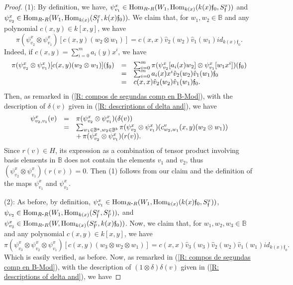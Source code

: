\documentclass{article}
\theoremstyle{definition}
\newcommand{\Hom}{{ \rm Hom }}
\renewcommand{\frak}{\mathfrak}
\newcommand{\g}{\hbox{-}}
\newcommand{\hueca}[1]{\mathbb{#1}}
\begin{document}
\begin{proof} (1): By definition, we have,
$\psi^x_{v_1}\in \Hom_{R\g R}(W_1,\Hom_{k(x)}(k(x)\frak{f}_0,S^x_\frak{f}))$  and  $\psi^x_{v_2}\in \Hom_{R\g R}(W_1,\Hom_{k(x)}(S^x_\frak{f},k(x)\frak{f}_0)).$
We claim that, for $w_1,w_2\in \hueca{B}$ and  any polynomial $c(x,y)\in k[x,y]$, we have 
$$\pi (\psi^x_{v_2}\otimes\psi^x_{v_1})[c(x,y)(w_2\otimes w_1)]=c(x,x)\hat{v}_2(w_2)\hat{v}_1(w_1)id_{k(x)\frak{f}_0}.$$  
Indeed, if $c(x,y)=\sum_{i=0}^ma_i(y)x^i$, we have
$$\begin{matrix}
\pi (\psi^x_{v_2}\otimes\psi^x_{v_1})[c(x,y)(w_2\otimes w_1)](\frak{f}_0)
&=&
\sum_{i=0}^m\pi(\psi^x_{v_2}[a_i(x)w_2]\otimes \psi^x_{v_1}[w_1x^i])(\frak{f}_0)\hfill\\
&=&
\sum_{i=0}^ma_i(x)x^i\hat{v}_2(w_2)\hat{v}_1(w_1)\frak{f}_0\hfill\\
&=&
c(x,x)\hat{v}_2(w_2)\hat{v}_1(w_1)\frak{f}_0.\hfill\\
\end{matrix}$$
Then, as remarked in (\ref{R: compos de segundas comp en B-Mod}), with the description of $\delta(v)$ given  in (\ref{R: descriptions of delta and}), we have 
$$\begin{matrix} 
\psi^x_{v_2,v_1}(v)&=&\pi (\psi^x_{v_2}\otimes\psi^x_{v_1})(\delta(v))\hfill\\
&=&
\sum_{w_1\in \hueca{B}^a,w_2\in \hueca{B}^b}\pi (\psi^x_{v_2}\otimes\psi^x_{v_1})(c^v_{w_2,w_1}(x,y)(w_2\otimes w_1))\hfill\\
&&+\,\pi (\psi^x_{v_2}\otimes\psi^x_{v_1})(r(v)).\hfill\\
\end{matrix}$$
Since $r(v)\in H$, its expression as a combination of tensor product involving  basis  elements in $\hueca{B}$ does not contain the elements $v_1$ and $v_2$, thus  $(\psi^x_{v_2}\otimes\psi^x_{v_1})(r(v))=0$.  Then (1) follows from our claim and the definition of the maps $\psi_{v_1}^x$ and $\psi_{v_2}^x$. 
\medskip

\noindent(2): As before, by definition, 
$\psi^x_{v_1}\in \Hom_{R\g R}(W_1,\Hom_{k(x)}(k(x)\frak{f}_0,S^x_\frak{f}))$,  
$\psi_{v_2}\in \Hom_{R\g R}(W_1,\Hom_{k(x)}(S^x_\frak{f},S^x_{\frak{f}'})),$
and $\psi^x_{v_3}\in \Hom_{R\g R}(W,\Hom_{k(x)}(S^x_{\frak{f}'},k(x)\frak{f}_0))$. Now, we claim that, for $w_1, w_2, w_3\in \hueca{B}$ and any polynomial $c(x,y)\in k[x,y]$, we have 
$$\pi (\psi^x_{v_3}\otimes\psi^x_{v_2}\otimes\psi^x_{v_1})[c(x,y)(w_3\otimes w_2\otimes w_1)]=c(x,x)\hat{v}_3(w_3)\hat{v}_2(w_2)\hat{v}_1(w_1)id_{k(x)\frak{f}_0}.$$ 
Which is easily verified, as before.   
Now, as remarked in (\ref{R: compos de segundas comp en B-Mod}), with the description of $(1\otimes\delta)\delta(v)$ given  in (\ref{R: descriptions of delta and}), we have 


\end{proof}
\end{document}
